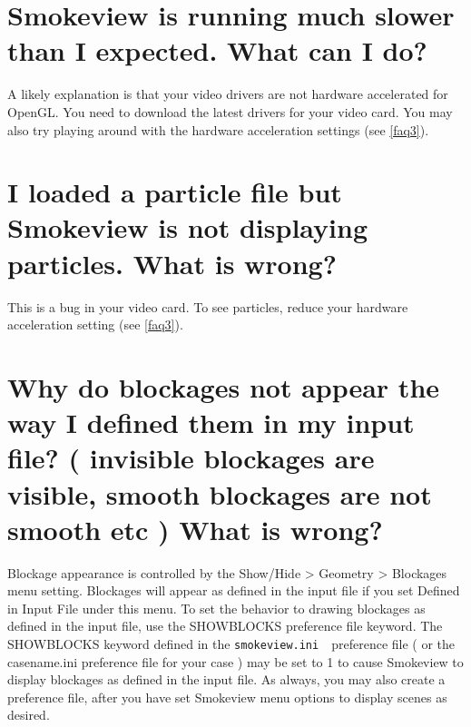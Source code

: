 \documentclass[11pt,twoside]{book}
\newcommand{\svini}{{\tt smokeview.ini}\ }
\begin{document}
\section{Smokeview is running much slower than I expected. What can I do?}

A likely explanation is that your video drivers are not hardware
accelerated for OpenGL. You need to download the latest drivers
for your video card. You may also try playing around with the
hardware acceleration settings (see \ref{faq3}).

\section{I loaded a particle file but Smokeview is not
displaying particles. What is wrong?}

This is a bug in your video card. To see particles, reduce your
hardware acceleration setting (see \ref{faq3}).

\section{Why do blockages not appear the way I defined them in
my input file? ( invisible blockages are visible, smooth blockages
are not smooth etc ) What is wrong?}

Blockage appearance is controlled by the Show/Hide > Geometry >
Blockages menu setting. Blockages will appear as defined in the
input file if you set Defined in Input File under this menu. To
set the behavior to drawing blockages as defined in the input
file, use the SHOWBLOCKS preference file keyword. The SHOWBLOCKS
keyword defined in the \svini\ preference file ( or the
casename.ini preference file for your case ) may be set to 1 to
cause Smokeview to display blockages as defined in the input file.
As always, you may also create a preference file, after you have
set Smokeview menu options to display scenes as desired.


%
%
%
\end{document}
